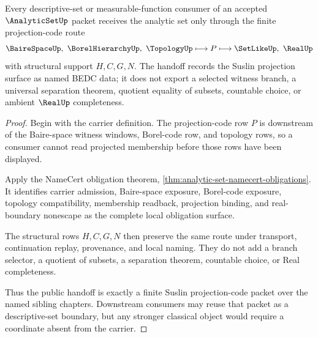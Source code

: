 \begin{theorem}
\label{thm:analytic-set-suslin-projection-handoff}
Every descriptive-set or measurable-function consumer of an accepted $\AnalyticSetUp$ packet receives the analytic set only through the finite projection-code route
$$
\BaireSpaceUp,\ \BorelHierarchyUp,\ \TopologyUp \longmapsto P \longmapsto \SetLikeUp,\ \RealUp
$$
with structural support $H,C,G,N$. The handoff records the Suslin projection surface as named BEDC data; it does not export a selected witness branch, a universal separation theorem, quotient equality of subsets, countable choice, or ambient $\RealUp$ completeness.
\end{theorem}
\begin{proof}
Begin with the carrier definition. The projection-code row $P$ is downstream of the Baire-space witness windows, Borel-code row, and topology rows, so a consumer cannot read projected membership before those rows have been displayed.

Apply the NameCert obligation theorem, \autoref{thm:analytic-set-namecert-obligations}. It identifies carrier admission, Baire-space exposure, Borel-code exposure, topology compatibility, membership readback, projection binding, and real-boundary nonescape as the complete local obligation surface.

The structural rows $H,C,G,N$ then preserve the same route under transport, continuation replay, provenance, and local naming. They do not add a branch selector, a quotient of subsets, a separation theorem, countable choice, or Real completeness.

Thus the public handoff is exactly a finite Suslin projection-code packet over the named sibling chapters. Downstream consumers may reuse that packet as a descriptive-set boundary, but any stronger classical object would require a coordinate absent from the carrier.
\end{proof}


